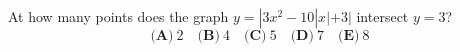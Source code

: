 At how many points does the graph $y=|3x^2-10|x|+3|$ intersect $y=3$?
\[\textbf{(A)}~2\quad\textbf{(B)}~4\quad\textbf{(C)}~5\quad\textbf{(D)}~7\quad\textbf{(E)}~8\]
